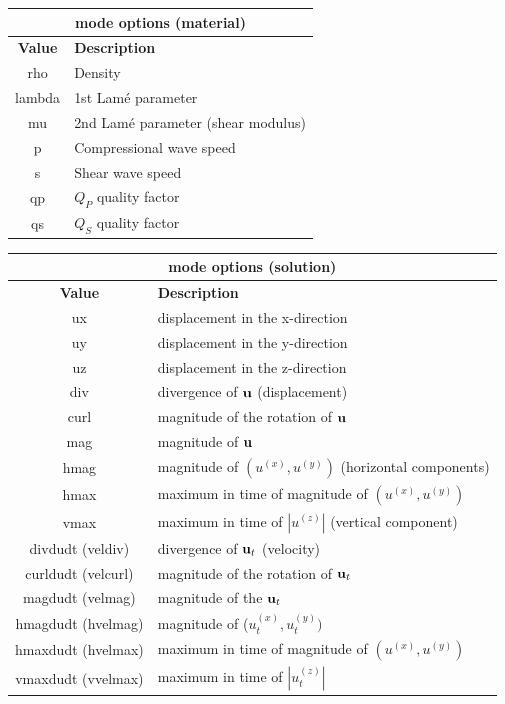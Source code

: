 \documentclass[11pt]{report}
\newcommand{\ub}{{\bf u}}
\begin{document}
\begin{center}
\begin{tabular}{|c|l|} \hline
\multicolumn{2}{|c|}{\bf mode options (material)}\\ \hline
\bf{Value} & \bf{Description} \\ 
\hline  \hline
rho     & Density \\ \hline
lambda  & 1st Lam\'e parameter \\ \hline
mu      & 2nd Lam\'e parameter (shear modulus) \\ \hline
p       & Compressional wave speed \\ \hline
s       & Shear wave speed \\ \hline
qp      & $Q_P$ quality factor \\ \hline
qs      & $Q_S$ quality factor \\ \hline
\end{tabular}
\end{center}
\begin{center}
\begin{tabular}{|c|l|} \hline
\multicolumn{2}{|c|}{\bf mode options (solution)}\\ \hline
\bf{Value} & \bf{Description} \\ 
\hline  \hline
ux      & displacement in the x-direction \\ \hline
uy      & displacement in the y-direction \\ \hline
uz      & displacement in the z-direction \\ \hline\hline
div     & divergence of $\ub$ (displacement) \\ \hline
curl    & magnitude of the rotation of $\ub$ \\ \hline 
mag     & magnitude of $\ub$ \\ \hline
hmag    & magnitude of $(u^{(x)}, u^{(y)})$ (horizontal components) \\ \hline
hmax & maximum in time of magnitude of $(u^{(x)}, u^{(y)})$ \\ \hline
vmax & maximum in time of $|u^{(z)}|$ (vertical component) \\ \hline\hline
%
divdudt (veldiv) & divergence of $\ub_t$ (velocity)\\ \hline
curldudt (velcurl) & magnitude of the rotation of $\ub_t$ \\ \hline
magdudt (velmag) & magnitude of the $\ub_t$ \\ \hline
hmagdudt (hvelmag)& magnitude of ($u^{(x)}_t, u^{(y)}_t)$ \\ \hline
hmaxdudt (hvelmax) & maximum in time of magnitude of $(u^{(x)}, u^{(y)})$ \\ \hline
vmaxdudt (vvelmax) & maximum in time of $|u^{(z)}_t|$    \\ \hline
\end{tabular}
\end{center}
\end{document}
